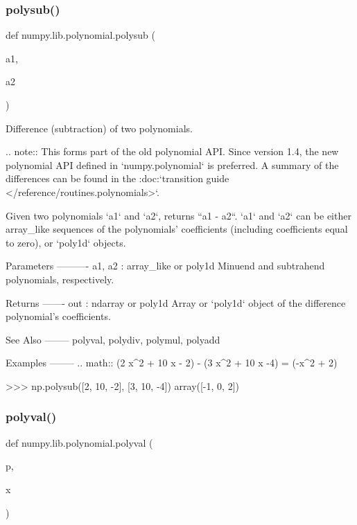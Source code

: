 \subsubsection{\texorpdfstring{polysub()}{polysub()}}
{\footnotesize\ttfamily def numpy.\+lib.\+polynomial.\+polysub (\begin{DoxyParamCaption}\item[{}]{a1,  }\item[{}]{a2 }\end{DoxyParamCaption})}

\begin{DoxyVerb}Difference (subtraction) of two polynomials.

.. note::
   This forms part of the old polynomial API. Since version 1.4, the
   new polynomial API defined in `numpy.polynomial` is preferred.
   A summary of the differences can be found in the
   :doc:`transition guide </reference/routines.polynomials>`.

Given two polynomials `a1` and `a2`, returns ``a1 - a2``.
`a1` and `a2` can be either array_like sequences of the polynomials'
coefficients (including coefficients equal to zero), or `poly1d` objects.

Parameters
----------
a1, a2 : array_like or poly1d
    Minuend and subtrahend polynomials, respectively.

Returns
-------
out : ndarray or poly1d
    Array or `poly1d` object of the difference polynomial's coefficients.

See Also
--------
polyval, polydiv, polymul, polyadd

Examples
--------
.. math:: (2 x^2 + 10 x - 2) - (3 x^2 + 10 x -4) = (-x^2 + 2)

>>> np.polysub([2, 10, -2], [3, 10, -4])
array([-1,  0,  2])\end{DoxyVerb}
 \mbox{\label{namespacenumpy_1_1lib_1_1polynomial_ae0b1caf06f430f8f3603c978d0ced250}} 
\subsubsection{\texorpdfstring{polyval()}{polyval()}}
{\footnotesize\ttfamily def numpy.\+lib.\+polynomial.\+polyval (\begin{DoxyParamCaption}\item[{}]{p,  }\item[{}]{x }\end{DoxyParamCaption})}

